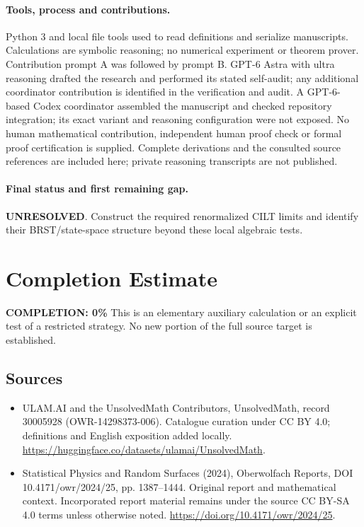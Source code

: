 \documentclass[11pt]{article}
\begin{document}
\paragraph{Tools, process and contributions.}
Python 3 and local file tools used to read definitions and serialize manuscripts. Calculations are symbolic reasoning; no numerical experiment or theorem prover. Contribution prompt A was followed by prompt B. GPT-6 Astra with ultra reasoning drafted the research and performed its stated self-audit; any additional coordinator contribution is identified in the verification and audit. A GPT-6-based Codex coordinator assembled the manuscript and checked repository integration; its exact variant and reasoning configuration were not exposed. No human mathematical contribution, independent human proof check or formal proof certification is supplied. Complete derivations and the consulted source references are included here; private reasoning transcripts are not published.

\paragraph{Final status and first remaining gap.}
\textbf{UNRESOLVED}. Construct the required renormalized CILT limits and identify their BRST/state-space structure beyond these local algebraic tests.

\section{Completion Estimate}
\noindent\textbf{COMPLETION: 0\%}
This is an elementary auxiliary calculation or an explicit test of a restricted strategy. No new portion of the full source target is established.

\subsection{Sources}
\begin{itemize}
\item[\hypertarget{source:30005928:1}{S1}] ULAM.AI and the UnsolvedMath Contributors, UnsolvedMath, record 30005928 (OWR-14298373-006). Catalogue curation under CC BY 4.0; definitions and English exposition added locally.
\url{https://huggingface.co/datasets/ulamai/UnsolvedMath}.
\item[\hypertarget{source:30005928:2}{S2}] Statistical Physics and Random Surfaces (2024), Oberwolfach Reports, DOI 10.4171/owr/2024/25, pp. 1387--1444. Original report and mathematical context. Incorporated report material remains under the source CC BY-SA 4.0 terms unless otherwise noted.
\url{https://doi.org/10.4171/owr/2024/25}.
\end{itemize}
\label{end:30005928}
\end{document}
